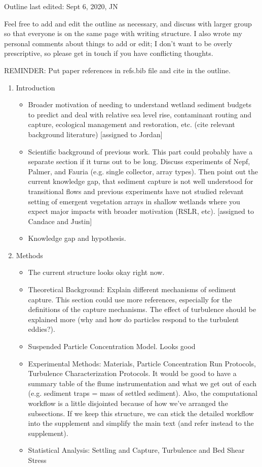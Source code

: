 \documentclass{scrreprt}
\begin{document}
Outline last edited: Sept 6, 2020, JN

Feel free to add and edit the outline as necessary, and discuss with larger group so that everyone is on the same page with writing structure. I also wrote my personal comments about things to add or edit; I don't want to be overly prescriptive, so please get in touch if you have conflicting thoughts.

REMINDER: Put paper references in refs.bib file and cite in the outline.

\begin{enumerate}
    \item Introduction
    \begin{itemize}
        \item Broader motivation of needing to understand wetland sediment budgets to predict and deal with relative sea level rise, contaminant routing and capture, ecological management and restoration, etc. (cite relevant background literature) [assigned to Jordan]
        \item Scientific background of previous work. This part could probably have a separate section if it turns out to be long. Discuss experiments of Nepf, Palmer, and Fauria (e.g. single collector, array types). Then point out the current knowledge gap, that sediment capture is not well understood for transitional flows and previous experiments have not studied relevant setting of emergent vegetation arrays in shallow wetlands where you expect major impacts with broader motivation (RSLR, etc). [assigned to Candace and Justin]
        \item Knowledge gap and hypothesis.
    \end{itemize}
    
    \item Methods
    \begin{itemize}
        \item The current structure looks okay right now.
        \item Theoretical Background: Explain different mechanisms of sediment capture. This section could use more references, especially for the definitions of the capture mechanisms. The effect of turbulence should be explained more (why and how do particles respond to the turbulent eddies?).
        \item Suspended Particle Concentration Model. Looks good
        \item Experimental Methods: Materials, Particle Concentration Run Protocols, Turbulence Characterization Protocols. It would be good to have a summary table of the flume instrumentation and what we get out of each (e.g. sediment traps = mass of settled sediment). Also, the computational workflow is a little disjointed because of how we've arranged the subsections. If we keep this structure, we can stick the detailed workflow into the supplement and simplify the main text (and refer instead to the supplement).
        \item Statistical Analysis: Settling and Capture, Turbulence and Bed Shear Stress
    \end{itemize}
    

\end{enumerate}
\end{document}
